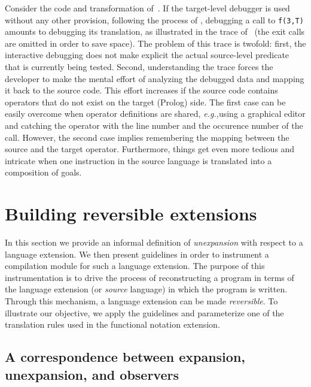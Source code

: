 \documentclass[preprint]{llncs}
\renewcommand\cref[1]{\Cref{#1}}
\newcommand{\eg}{\emph{e.g.,\xspace}}
\newcommand{\pre}[1]{\texttt{#1}}
\begin{document}
\begin{example}
  Consider the code and transformation of~\cref{ex:ex0}. If the
  target-level debugger is used without any other provision, following
  the process of \cref{fig:debugprocess}, debugging a call to
  \pre{f(3,T)} amounts to debugging its translation, as illustrated in
  the trace of~\cref{fig:ex0debug} (the exit calls are omitted in
  order to save space).  The problem of this trace is twofold: first,
  the interactive debugging does not make explicit the actual source-level
  predicate that is currently being tested. Second,
  understanding the trace forces the developer to make the mental
  effort of analyzing the debugged data and mapping it back to the
  source code. This effort increases if the source code contains
  operators that do not exist on the target (Prolog) side. The first
  case can be easily overcome when operator definitions are shared,
  \eg using a graphical editor and catching the operator with the line
  number and the occurence number of the call. However, the second
  case implies remembering the mapping between the source and the
  target operator. Furthermore, things get even more tedious and
  intricate when one instruction in the source language is
  translated into a composition of goals.
\end{example}
 


\section{Building reversible extensions}
\label{sec:unexpansion}

In this section we provide an informal definition of \emph{unexpansion} with
respect to a language extension. We then present guidelines in order
to instrument a compilation module for such a language extension. The
purpose of this instrumentation is to drive the process of
reconstructing a program in terms of the language extension (or
\emph{source} language) in which the program is written. Through this
mechanism, a language extension can be made \emph{reversible}.  To
illustrate our objective, we apply the guidelines and parameterize one
of the translation rules used in the functional notation extension.

\subsection{A correspondence between expansion, unexpansion, and observers}
\end{document}
